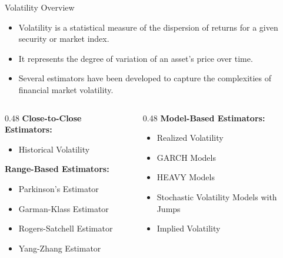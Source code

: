\documentclass[9pt, aspectratio=169, t]{beamer}
\theoremstyle{definition}
\begin{document}
\begin{frame}{Volatility Overview}

\begin{itemize}
    \item Volatility is a statistical measure of the dispersion of returns for a given security or market index.
    \item It represents the degree of variation of an asset's price over time.
    \item Several estimators have been developed to capture the complexities of financial market volatility.
\end{itemize}

\vspace{0.3cm}

\begin{columns}[T]
\begin{column}{0.48\textwidth}
\textbf{Close-to-Close Estimators:}
\begin{itemize}
    \item Historical Volatility
\end{itemize}

\vspace{0.2cm}

\textbf{Range-Based Estimators:}
\begin{itemize}
    \item Parkinson's Estimator
    \item Garman-Klass Estimator
    \item Rogers-Satchell Estimator
    \item Yang-Zhang Estimator
\end{itemize}
\end{column}
\begin{column}{0.48\textwidth}
\textbf{Model-Based Estimators:}
\begin{itemize}
    \item Realized Volatility
    \item GARCH Models
    \item HEAVY Models
    \item Stochastic Volatility Models with Jumps
    \item Implied Volatility
\end{itemize}
\end{column}
\end{columns}

\end{frame}
\end{document}
